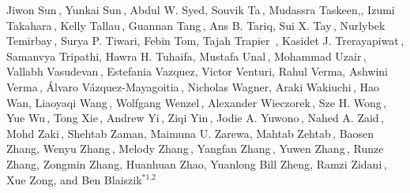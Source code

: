 \begin{center}
Jiwon Sun\,,\;
Yunkai Sun\,,\;
Abdul W. Syed,\;
Souvik Ta\,,\;
Mudassra Taskeen,,\;
Izumi Takahara\,,\;
Kelly Tallau\,,\;
Guannan Tang\,,\;
Ans B. Tariq,\;
Sui X. Tay\,,\;
Nurlybek Temirbay\,,\;
Surya P. Tiwari,\;
Febin Tom,\;
Tajah Trapier\, ,\;
Kasidet J. Trerayapiwat\,,\;
Samanvya Tripathi,\;
Hawra H. Tuhaifa,\;
Mustafa Unal\,,\;
Mohammad Uzair\,,\;
Vallabh Vasudevan\,,\;
Estefania Vazquez,\;
Victor Venturi,\;
Rahul Verma,\;
Ashwini Verma\,,\;
\'{A}lvaro V\'{a}zquez-Mayagoitia\,,\;
Nicholas Wagner,\;
Araki Wakiuchi\,,\;
Hao Wan,\;
Liaoyaqi Wang\,,\;
Wolfgang Wenzel\,,\;
Alexander Wieczorek\,,\;
Sze H. Wong\,,\;
Yue Wu\,,\;
Tong Xie\,,\;
Andrew Yi\,,\;
Ziqi Yin\,,\;
Jodie A. Yuwono\,,\;
Nahed A. Zaid\,,\;
Mohd Zaki\,,\;
Shehtab Zaman,\;
Maimuna U. Zarewa,\;
Mahtab Zehtab\,,\;
Baosen Zhang,\;
Wenyu Zhang\,,\;
Melody Zhang\,,\;
Yangfan Zhang\,,\;
Yuwen Zhang\,,\;
Runze Zhang,\;
Zongmin Zhang,\;
Huanhuan Zhao,\;
Yuanlong Bill Zheng,\;
Ramzi Zidani\,,\;
Xue Zong,\;
and Ben Blaiszik$^{*\textit{1,2}}$\,

\end{center}




